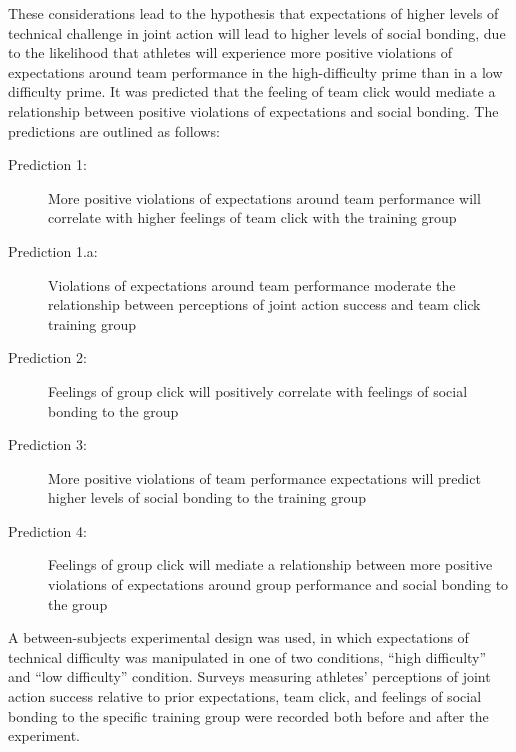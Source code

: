 

These considerations lead to the hypothesis that expectations of higher levels of technical challenge in joint action will lead to higher levels of social bonding, due to the likelihood that athletes will experience more positive violations of expectations around team performance in the high-difficulty prime than in a low difficulty prime. It was predicted that the feeling of team click would mediate a relationship between positive violations of expectations and social bonding.  The predictions are outlined as follows:

\begin{description}
\item[Prediction 1:] More positive violations of expectations around team performance will correlate with higher feelings of team click with the training group
\item[Prediction 1.a:] Violations of expectations around team performance moderate the relationship between perceptions of joint action success and team click training group
\item[Prediction 2:] Feelings of group click will positively correlate with feelings of social bonding to the group
\item[Prediction 3:] More positive violations of team performance expectations will predict higher levels of social bonding to the training group
\item[Prediction 4:] Feelings of group click will mediate a relationship between more positive violations of expectations around group performance and social bonding to the group
\end{description}

A between-subjects experimental design was used, in which expectations of technical difficulty was manipulated in one of two conditions, ``high difficulty'' and ``low difficulty'' condition.  Surveys measuring athletes' perceptions of joint action success relative to prior expectations, team click, and feelings of social bonding to the specific training group were recorded both before and after the experiment.

